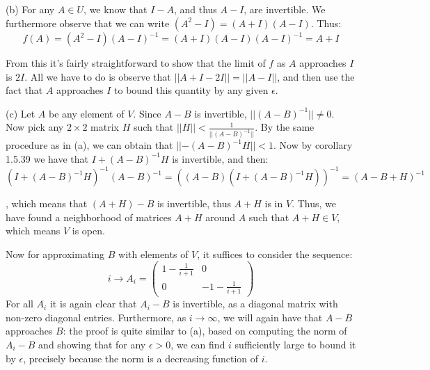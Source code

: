 \begin{solution}
    (b) For any $A \in U$, we know that $I - A$, and thus $A - I$, are invertible. We furthermore observe that we can write $(A^2-I) = (A+I)(A-I)$. Thus:
    $$f(A) = (A^2-I)(A-I)^{-1} = (A+I)(A-I)(A-I)^{-1} = A+I$$

    From this it's fairly straightforward to show that the limit of $f$ as $A$ approaches $I$ is $2I$. All we have to do is observe that $\lvert \lvert A + I - 2I \rvert \rvert = \lvert \lvert A - I \rvert \rvert$, and then use the fact that $A$ approaches $I$ to bound this quantity by any given $\epsilon$.

    (c) Let $A$ be any element of $V$. Since $A - B$ is invertible, $\lvert \lvert (A - B)^{-1} \rvert \rvert \neq 0$. Now pick any $2\times 2$ matrix $H$ such that $\lvert \lvert H \rvert \rvert < \frac{1}{\lvert \lvert (A-B)^{-1} \rvert \rvert}$. By the same procedure as in (a), we can obtain that $\lvert \lvert -(A-B)^{-1}H\rvert \rvert < 1$. Now by corollary 1.5.39 we have that $I  + (A-B)^{-1}H$ is invertible, and then:
    $$(I + (A-B)^{-1}H)^{-1}(A-B)^{-1} = ((A-B)(I + (A-B)^{-1}H))^{-1} = (A-B + H)^{-1}$$

    , which means that $(A+H) - B$ is invertible, thus $A+H$ is in $V$. Thus, we have found a neighborhood of matrices $A+H$ around $A$ such that $A+H \in V$, which means $V$ is open.

    Now for approximating $B$ with elements of $V$, it suffices to consider the sequence:
    $$i \rightarrow A_i = \begin{pmatrix}
        1  - \frac{1}{i+1} & 0 \\ 0 & -1 - \frac{1}{i+1}
    \end{pmatrix}$$
    For all $A_i$ it is again clear that $A_i - B$ is invertible, as a diagonal matrix with non-zero diagonal entries. Furthermore, as $i \rightarrow \infty$, we will again have that $A-B$ approaches $B$: the proof is quite similar to (a), based on computing the norm of $A_i - B$ and showing that for any $\epsilon >  0$, we can find $i$ sufficiently large to bound it by $\epsilon$, precisely because the norm is a decreasing function of $i$.


\end{solution}
